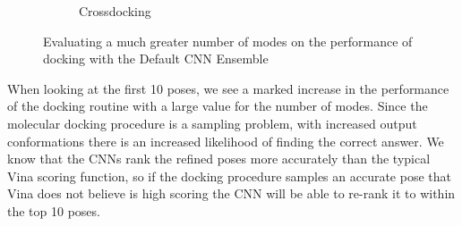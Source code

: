 \documentclass[journal=jcisd8,manuscript=article]{achemso}
\begin{document}
\begin{figure}
\begin{subfigure}[b]{0.48\textwidth}
		\caption{Crossdocking}
		\label{fig:num modes cd}
        \end{subfigure}    
	\caption{Evaluating a much greater number of modes on the performance of docking with the Default CNN Ensemble}
	\label{fig:num modes}
\end{figure}    

When looking at the first 10 poses, we see a marked increase in the performance of the docking routine with a large value for the number of modes. Since the molecular docking procedure is a sampling problem, with increased output conformations there is an increased likelihood of finding the correct answer. We know that the CNNs rank the refined poses more accurately than the typical Vina scoring function, so if the docking procedure samples an accurate pose that Vina does not believe is high scoring the CNN will be able to re-rank it to within the top 10 poses.
\end{document}
